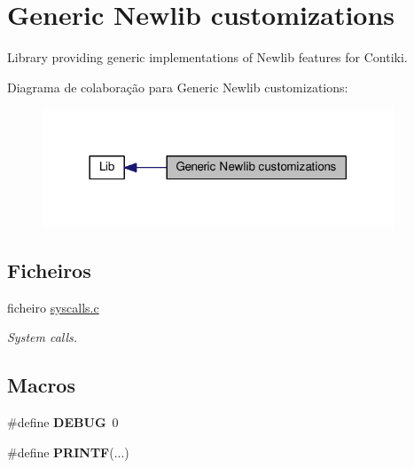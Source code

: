 \hypertarget{group__newlib}{\section{Generic Newlib customizations}
\label{group__newlib}
}


Library providing generic implementations of Newlib features for Contiki.  


Diagrama de colaboração para Generic Newlib customizations\+:\nopagebreak
\begin{figure}[H]
\begin{center}
\leavevmode
\includegraphics[width=297pt]{group__newlib}
\end{center}
\end{figure}
\subsection*{Ficheiros}
\begin{DoxyCompactItemize}
\item 
ficheiro \hyperlink{syscalls_8c}{syscalls.\+c}
\begin{DoxyCompactList}\small\item\em System calls. \end{DoxyCompactList}\end{DoxyCompactItemize}
\subsection*{Macros}
\begin{DoxyCompactItemize}
\item 
\hypertarget{group__newlib_gad72dbcf6d0153db1b8d8a58001feed83}{\#define {\bfseries D\+E\+B\+U\+G}~0}\label{group__newlib_gad72dbcf6d0153db1b8d8a58001feed83}

\item 
\hypertarget{group__newlib_ga1f464e950a4fa11e8821b5c725921a15}{\#define {\bfseries P\+R\+I\+N\+T\+F}(...)}\label{group__newlib_ga1f464e950a4fa11e8821b5c725921a15}

\end{DoxyCompactItemize}
